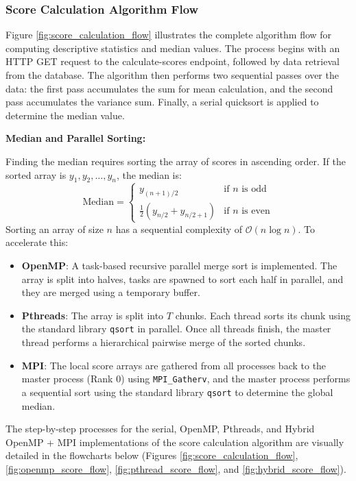 \documentclass[12pt,a4paper]{article}
\begin{document}
\subsubsection{Score Calculation Algorithm Flow}

Figure \ref{fig:score_calculation_flow} illustrates the complete algorithm flow for computing descriptive statistics and median values. The process begins with an HTTP GET request to the calculate-scores endpoint, followed by data retrieval from the database. The algorithm then performs two sequential passes over the data: the first pass accumulates the sum for mean calculation, and the second pass accumulates the variance sum. Finally, a serial quicksort is applied to determine the median value.
\clearpage

\noindent\textbf{Median and Parallel Sorting:} 

Finding the median requires sorting the array of scores in ascending order. If the sorted array is $y_1, y_2, \dots, y_n$, the median is:
\begin{equation}
    \text{Median} = \begin{cases}
        y_{(n+1)/2} & \text{if } n \text{ is odd} \\
        \frac{1}{2} \left( y_{n/2} + y_{n/2 + 1} \right) & \text{if } n \text{ is even}
    \end{cases}
\end{equation}
Sorting an array of size $n$ has a sequential complexity of $\mathcal{O}(n \log n)$. To accelerate this:
\begin{itemize}
    \item \textbf{OpenMP}: A task-based recursive parallel merge sort is implemented. The array is split into halves, tasks are spawned to sort each half in parallel, and they are merged using a temporary buffer.
    \item \textbf{Pthreads}: The array is split into $T$ chunks. Each thread sorts its chunk using the standard library \texttt{qsort} in parallel. Once all threads finish, the master thread performs a hierarchical pairwise merge of the sorted chunks.
    \item \textbf{MPI}: The local score arrays are gathered from all processes back to the master process (Rank 0) using \texttt{MPI\_Gatherv}, and the master process performs a sequential sort using the standard library \texttt{qsort} to determine the global median.
\end{itemize}

The step-by-step processes for the serial, OpenMP, Pthreads, and Hybrid OpenMP + MPI implementations of the score calculation algorithm are visually detailed in the flowcharts below (Figures \ref{fig:score_calculation_flow}, \ref{fig:openmp_score_flow}, \ref{fig:pthread_score_flow}, and \ref{fig:hybrid_score_flow}).
\end{document}
